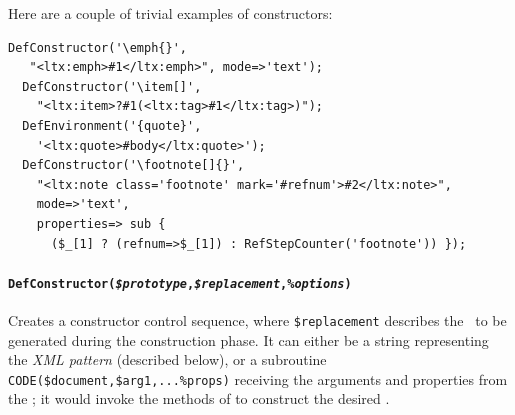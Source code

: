 \documentclass{book}
\newcommand{\ltxcode}{\lstinline[style=inlinelatexml]}
\begin{document}
Here are a couple of trivial examples of constructors:
\begin{lstlisting}[style=latexml]
  DefConstructor('\emph{}',
   "<ltx:emph>#1</ltx:emph>", mode=>'text');
  DefConstructor('\item[]',
    "<ltx:item>?#1(<ltx:tag>#1</ltx:tag>)");
  DefEnvironment('{quote}',   
    '<ltx:quote>#body</ltx:quote>');
  DefConstructor('\footnote[]{}',
    "<ltx:note class='footnote' mark='#refnum'>#2</ltx:note>",
    mode=>'text',
    properties=> sub { 
      ($_[1] ? (refnum=>$_[1]) : RefStepCounter('footnote')) });
\end{lstlisting}

\paragraph[DefConstructor]{%
   \texttt{DefConstructor(\textit{\$prototype},\textit{\$replacement},\textit{\%options})}}
Creates a constructor control sequence, where \ltxcode|$replacement| describes the \XML\ to %
be generated during the construction phase. It can either be a string
representing the \emph{XML pattern} (described below), or a
subroutine \ltxcode|CODE($document,$arg1,...%
receiving the arguments and properties from the ;
it would invoke the methods of  to construct the desired \XML.
\end{document}

